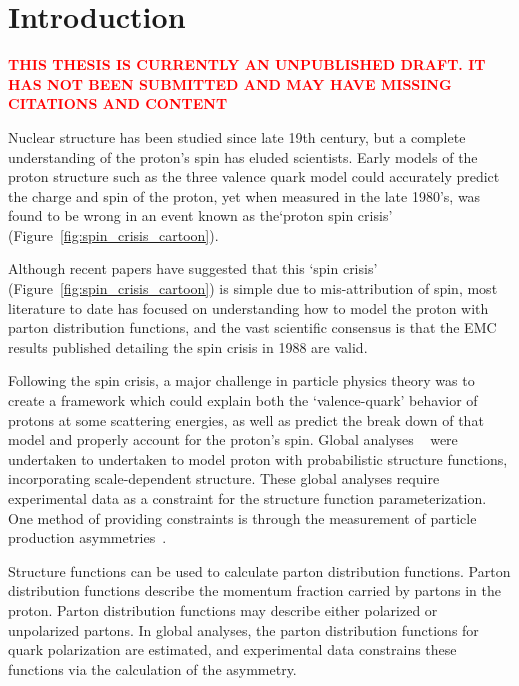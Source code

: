 \chapter{Introduction}

\textbf{\textcolor{red}{THIS THESIS IS CURRENTLY AN UNPUBLISHED DRAFT. IT HAS
NOT BEEN SUBMITTED AND MAY HAVE MISSING CITATIONS AND CONTENT}}

Nuclear structure has been studied since late 19th century, but a complete
understanding of the proton's spin has eluded scientists.  Early models of the
proton structure such as the three valence quark model could accurately predict
the charge and spin of the proton, yet when measured in the late 1980's, was
found to be wrong in an event known as the`proton spin crisis'
(Figure~\ref{fig:spin_crisis_cartoon}).

Although recent papers \cite{Povh2016} have suggested that this `spin crisis'
(Figure~\ref{fig:spin_crisis_cartoon}) is simple due to mis-attribution of
spin, most literature to date has focused on understanding how to model the
proton with parton distribution functions, and the vast scientific consensus is
that the EMC results published detailing the spin crisis in 1988 are valid.

Following the spin crisis, a major challenge in particle physics theory was to
create a framework which could explain both the `valence-quark' behavior of
protons at some scattering energies, as well as predict the break down of that
model and properly account for the proton's spin. Global analyses
~\cite{DeFlorian2009} were undertaken to undertaken to model proton with
probabilistic structure functions, incorporating scale-dependent structure.
These global analyses require experimental data as a constraint for the
structure function parameterization. One method of providing constraints is
through the measurement of particle production asymmetries~\cite{Kang2011}.

Structure functions can be used to calculate parton distribution functions.
Parton distribution functions describe the momentum fraction carried by partons
in the proton. Parton distribution functions may describe either polarized or
unpolarized partons. In global analyses, the parton distribution functions for
quark polarization are estimated, and experimental data constrains these
functions via the calculation of the asymmetry.

